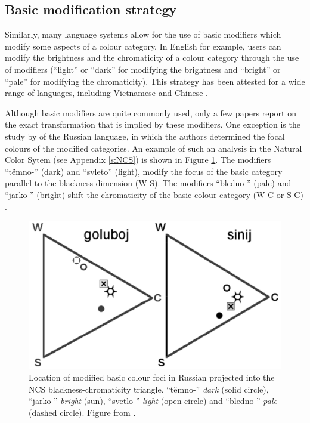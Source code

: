 \subsection{Basic modification strategy}

Similarly, many language systems allow for the use of basic
modifiers which modify some aspects of a colour category. In English
for example, users can modify the brightness and the chromaticity of a
colour category through the use of modifiers (``light'' or ``dark''
for modifying the brightness and ``bright'' or ``pale'' for modifying
the chromaticity). This strategy has been attested for a wide range of
languages, including Vietnamese \citep{alvarado02modifying} and
Chinese \citep{lin01unconstrained}.

Although basic modifiers are quite commonly used, only a few
papers report on the exact transformation that is implied by these
modifiers. One exception is the study by \cite{safuanova07russian} of
the Russian language, in which the authors determined the focal
colours of the modified categories. An example of such an analysis in
the Natural Color Sytem (see Appendix \ref{s:NCS}) is shown in Figure
\ref{f:intro-russian-modifiers}. The modifiers ``t\"emno-'' (dark) and
``svleto'' (light), modify the focus of the basic category parallel to
the blackness dimension (W-S). The modifiers ``bledno-'' (pale) and
``jarko-'' (bright) shift the chromaticity of the basic colour
category (W-C or S-C) \citep{safuanova07russian}.

\begin{figure}[htpb]
  \centering
  \includegraphics[width=.6\textwidth]{./intro/figures/russian-diagram.pdf}
  \caption[Location of modified basic colour foci in Russian]{Location
    of modified basic colour foci in Russian projected into the NCS
    blackness-chromaticity triangle. ``t\"emno-'' \emph{dark} (solid
    circle), ``jarko-'' \emph{bright} (sun), ``svetlo-'' \emph{light}
    (open circle) and ``bledno-'' \emph{pale} (dashed circle). Figure
    from \cite{paramei05singing}.}
  \label{f:intro-russian-modifiers}
\end{figure}

